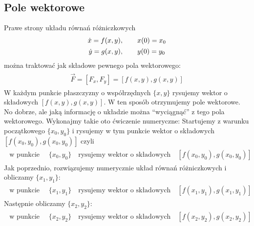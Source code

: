 \documentclass[a4paper,12pt,polish]{sphinxmanual}
\begin{document}
\subsection{Pole wektorowe}
\label{ch1/chI021:pole-wektorowe}
Prawe strony układu równań różniczkowych
\label{ch1/chI021:equation-eqn61}\begin{gather}
\begin{split} \dot x = f(x, y), \quad \quad x(0) = x_0\end{split}\label{ch1/chI021-eqn61}\\\begin{split} \dot y= g(x, y),\quad \quad y(0) = y_0\end{split}\notag
\end{gather}
można traktować jak składowe pewnego pola wektorowego:
\label{ch1/chI021:equation-eqn63}\begin{gather}
\begin{split}\vec F = [F_x, F_y] = [f(x, y), g(x, y)]\end{split}\label{ch1/chI021-eqn63}
\end{gather}
W każdym punkcie płaszczyzny o współrzędnych $\{x, y\}$ rysujemy wektor  o składowych  $[f(x, y), g(x, y)]$. W ten sposób otrzymujemy pole wektorowe. No dobrze, ale jaką informację o układzie można ``wyciągnąć'' z tego pola wektorowego. Wykonajmy takie oto ćwiczenie numeryczne: Startujemy z warunku początkowego $\{x_0, y_0\}$ i rysujemy w tym punkcie wektor o składowych $[f(x_0, y_0), g(x_0, y_0)]$ czyli
\label{ch1/chI021:equation-eqn64}\begin{gather}
\begin{split}\mbox{w punkcie }  \quad \{x_0, y_0\}   \quad \mbox{rysujemy wektor o składowych} \quad [f(x_0, y_0), g(x_0, y_0)]\end{split}\label{ch1/chI021-eqn64}
\end{gather}
Jak poprzednio, rozwiązujemy numerycznie układ równań różniczkowych i obliczamy  $\{x_1, y_1\}$:
\label{ch1/chI021:equation-eqn65}\begin{gather}
\begin{split}\mbox{w punkcie }  \quad \{x_1, y_1\}   \quad \mbox{rysujemy wektor o składowych} \quad [f(x_1, y_1), g(x_1, y_1)]\end{split}\label{ch1/chI021-eqn65}
\end{gather}
Następnie obliczamy  $\{x_2, y_2\}$:
\label{ch1/chI021:equation-eqn66}\begin{gather}
\begin{split}\mbox{w punkcie }  \quad \{x_2, y_2\}   \quad \mbox{rysujemy wektor o składowych} \quad [f(x_2, y_2), g(x_2, y_2)]\end{split}\label{ch1/chI021-eqn66}
\end{gather}
\end{document}
